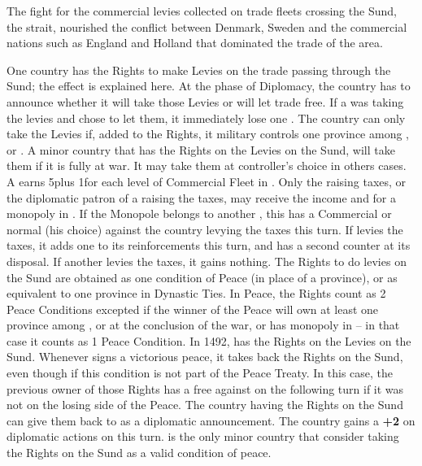 \label{chSpecific:Sund Levies}
\begin{designnote}
  The fight for the commercial levies collected on trade fleets crossing the
  Sund, the  strait, nourished the conflict between Denmark,
  Sweden and the commercial nations such as England and Holland that dominated
  the trade of the area.
\end{designnote}
\aparag One country has the Rights to make Levies on the trade passing through
the Sund; the effect is explained here.
\bparag At the phase of Diplomacy, the country has to announce whether it will
take those Levies or will let trade free.
\bparag If a \MAJ was taking the levies and chose to let them, it immediately
lose one \STAB.
\bparag The country can only take the Levies if, added to the Rights, it
military controls one province among ,
 or .
\bparag A minor country that has the Rights on the Levies on the Sund, will
take them if it is fully at war. It may take them at controller's choice in
others cases.
\bparag A \MAJ earns 5\ducats plus 1\ducats for each level of Commercial Fleet
in .
\bparag Only the \MAJ raising taxes, or the diplomatic patron of a \MIN
raising the taxes, may receive the income and \PV for a monopoly in
. If the Monopole belongs to another \MAJ, this \MAJ has a
Commercial or normal \CB (his choice) against the country levying the taxes
this turn.
\bparag If  levies the taxes, it adds one \LD to its
reinforcements this turn, and has a second \ARMY counter at its disposal.
\bparag If another \MIN levies the taxes, it gains nothing.
\bparag The Rights to do levies on the Sund are obtained as one condition of
Peace (in place of a province), or as equivalent to one province in Dynastic
Ties.
\bparag In Peace, the Rights count as 2 Peace Conditions excepted if the
winner of the Peace will own at least one province among ,
 or  at the conclusion of the war,
or has monopoly in  -- in that case it counts as 1 Peace
Condition.
\bparag In 1492,  has the Rights on the Levies on the Sund.
\bparag Whenever  signs a victorious peace, it takes back the
Rights on the Sund, even though if this condition is not part of the Peace
Treaty. In this case, the previous owner of those Rights has a free \CB
against  on the following turn if it was not on the losing side
of the Peace.
\bparag The country having the Rights on the Sund can give them back to
 as a diplomatic announcement. The country gains a {\bf +2} on
diplomatic actions on  this turn.
\bparag {} is the only minor country that consider taking the
Rights on the Sund as a valid condition of peace.


